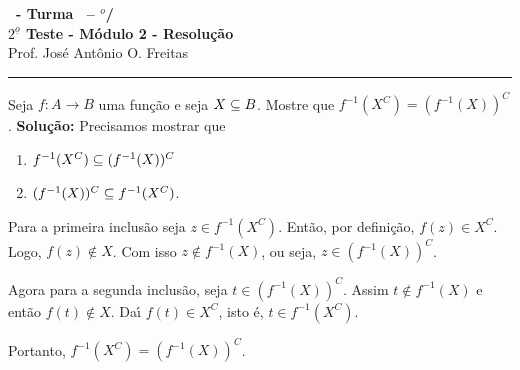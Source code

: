 \documentclass[12pt]{exam}
\begin{document}
\begin{center}
{\Large\bf \disciplina\ - Turma \turma\ -- \semestre$^{o}$/\ano} \\ \vspace{9pt} {\large\bf
$2^{\underline{o}}$ Teste - M\'odulo 2 - Resolu\c{c}\~ao}\\
\vspace{9pt} Prof. Jos{\'e} Ant{\^o}nio O. Freitas
\end{center}
\hrule

\vspace{.6cm}

\questao Seja $f : A \to B$ uma fun{\c c}{\~a}o e seja $X \subseteq B$. Mostre que $f^{-1}(X^C) = (f^{-1}(X))^C$.
\noindent\textbf{Solu\c{c}\~ao:} Precisamos mostrar que
\begin{enumerate}
    \item $f^{-1}(X^C) \subseteq (f^{-1}(X))^C$
    \item $(f^{-1}(X))^C \subseteq f^{-1}(X^C)$.
\end{enumerate}

Para a primeira inclus\~ao seja $z \in f^{-1}(X^C)$. Ent\~ao, por defini\c{c}\~ao, $f(z) \in X^C$. Logo, $f(z) \notin X$. Com isso $z \notin f^{-1}(X)$, ou seja, $z \in (f^{-1}(X))^C$.

Agora para a segunda inclus\~ao, seja $t \in (f^{-1}(X))^C$. Assim $t \notin f^{-1}(X)$ e ent\~ao $f(t) \notin X$. Da{\'\i} $f(t) \in X^C$, isto \'e, $t \in f^{-1}(X^C)$.

Portanto, $f^{-1}(X^C) = (f^{-1}(X))^C$.


\vspace{.5cm}
\end{document}
